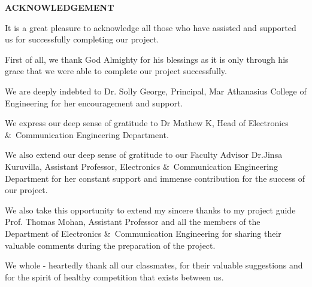 \documentclass[12pt,a4paper]{report}
\begin{document}
\newpage
{}
\setcounter{page}{1}
\begin{verbatim}
\end{verbatim}
\begin{center}
\textbf {\large ACKNOWLEDGEMENT}
\end{center}
\vspace{0.4125in}
\par
It is a great pleasure to acknowledge all those who have assisted and supported us for successfully completing our project.
\\
\par 
First of all, we thank God Almighty for his blessings as it is only through his grace that we were able to complete our project successfully.
\\
\par 
We are deeply indebted to Dr. Solly George, Principal, Mar Athanasius College of Engineering for her encouragement and support.
\\
\par
We express our deep sense of gratitude to Dr Mathew K, Head of Electronics \&\  Communication Engineering Department.
\\
\par
We also extend our deep sense of gratitude to our Faculty Advisor Dr.Jinsa Kuruvilla, Assistant Professor, Electronics \&\  Communication Engineering Department for her constant support and immense contribution for the success of our project.
\\
\par
We also take this opportunity to extend my sincere thanks to my project guide Prof. Thomas Mohan, Assistant Professor and all the members of the Department of Electronics \&\ Communication Engineering for sharing their valuable comments during the preparation of the project.
\\
\par
We whole - heartedly thank all our classmates, for their valuable suggestions and for the spirit of healthy competition that exists between us.
\\


 
 
\end{document}
